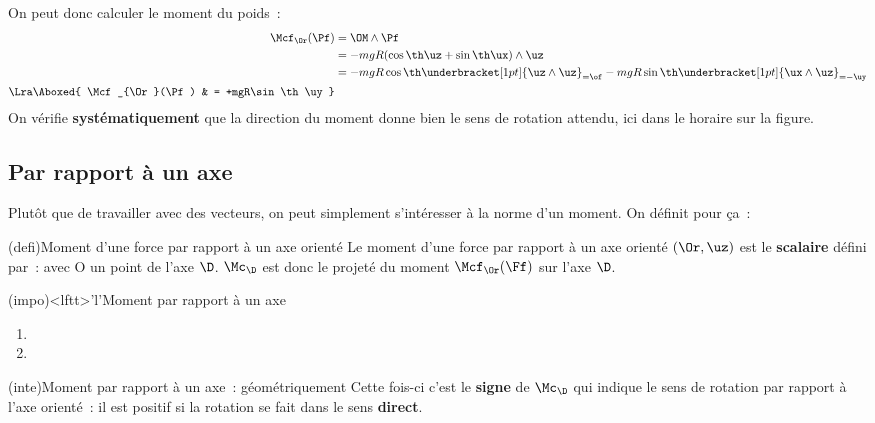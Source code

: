 \documentclass[../../main/main.tex]{subfiles}
\begin{document}
\begin{tcb*}
{		On peut donc calculer le moment du poids~:
		\begin{align*}
			\Mcf_{\Or}(\Pf) & = \OM\wedge\Pf                                       \\
			                & = -mgR(\cos\th\uz + \sin\th\ux)\wedge\uz             \\
			                & = -mgR\cos\th\underbracket[1pt]{\uz\wedge\uz}_{=\of}
			-mgR\sin\th\underbracket[1pt]{\ux\wedge\uz}_{=-\uy}                    \\
			\Lra
			\Aboxed{
			\Mcf_{\Or}(\Pf) & = +mgR\sin\th\uy
			}
		\end{align*}
		On vérifie \textbf{systématiquement} que la direction du moment donne bien
		le sens de rotation attendu, ici dans le horaire sur la figure.
	}
\end{tcb*}

\subsection{Par rapport à un axe }
Plutôt que de travailler avec des vecteurs, on peut simplement s'intéresser à la
norme d'un moment. On définit pour ça~:
\begin{tcb*}(defi){Moment d'une force par rapport à un axe orienté}
	Le moment d'une force par rapport à un axe orienté $(\Or,\uz)$ est le
	\textbf{scalaire} défini par~:
	\psw{
		\[
			\Mc_{\D}(\Ff) =
			\left(\OM\wedge\Ff\right)\cdot\ud =
			\Mcf_{\Or}(\Ff)\cdot\ud
		\]
	}
	avec O un point de l'axe $\D$. $\Mc_{\D}$ est donc le projeté du moment
	$\Mcf_{\Or}(\Ff)$ sur l'axe $\D$.
\end{tcb*}
\begin{tcb*}(impo)<lftt>'l'{Moment par rapport à un axe}
	\begin{enumerate}
		\item {}
		\item {}
	\end{enumerate}
\end{tcb*}
\begin{tcb*}(inte){Moment par rapport à un axe~: géométriquement}
	Cette fois-ci c'est le \textbf{signe} de $\Mc_{\D}$ qui indique le
	sens de rotation par rapport à l'axe orienté~: il est positif si la
	rotation se fait dans le sens \textbf{direct}.
\end{tcb*}
\end{document}
